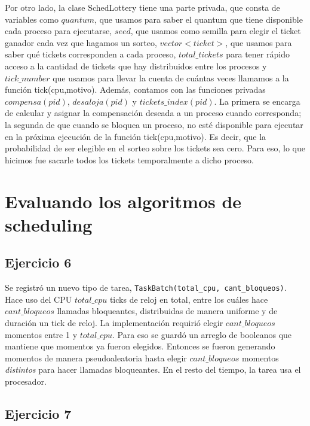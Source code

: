 \documentclass[11pt, a4paper, twoside]{article}
\begin{document}
Por otro lado, la clase SchedLottery tiene una parte privada, que consta de variables como $quantum$, 
que usamos para saber el quantum que tiene disponible cada proceso para ejecutarse, $seed$, que
usamos como semilla para elegir el ticket ganador cada vez que hagamos un sorteo, $vector<ticket>$, que
usamos para saber qué tickets corresponden a cada proceso, $total\_tickets$ para tener rápido acceso
a la cantidad de tickets que hay distribuidos entre los procesos y $tick\_number$ que usamos para 
llevar la cuenta de cuántas veces llamamos a la función tick(cpu,motivo). Además, contamos con 
las funciones privadas $compensa(pid)$, $desaloja(pid)$ y $tickets\_index(pid)$. La primera se encarga de
calcular y asignar la compensación deseada a un proceso cuando corresponda; la segunda de que cuando
se bloquea un proceso, no esté disponible para ejecutar en la próxima ejecución de la función
tick(cpu,motivo). Es decir, que la probabilidad de ser elegible en el sorteo sobre los tickets sea cero.
Para eso, lo que hicimos fue sacarle todos los tickets temporalmente a dicho proceso. 


\clearpage
{}
\section{Evaluando los algoritmos de scheduling}
\setcounter{subsection}{5}

\subsection{Ejercicio 6}

Se registró un nuevo tipo de tarea, \texttt{TaskBatch(total\_cpu, cant\_bloqueos)}. Hace uso del CPU $total\_cpu$ ticks de reloj en total, entre los cuáles hace $cant\_bloqueos$ llamadas bloqueantes, distribuidas de manera uniforme y de duración un tick de reloj.
La implementación requirió elegir $cant\_bloqueos$ momentos entre 1 y $total\_cpu$. Para eso se guardó un arreglo de booleanos que mantiene que momentos ya fueron elegidos. Entonces se fueron generando momentos de manera pseudo\-aleatoria hasta elegir $cant\_bloqueos$ momentos \textit{distintos} para hacer llamadas bloqueantes. En el resto del tiempo, la tarea usa el procesador.

\clearpage
\subsection{Ejercicio 7}
\clearpage
\end{document}
